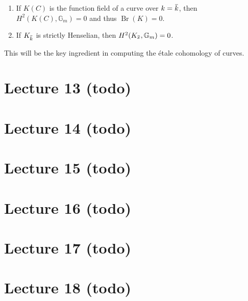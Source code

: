 \begin{theorem}[?]

\envlist

\begin{enumerate}
\def\labelenumi{\arabic{enumi}.}
\item
  If \(K(C)\) is the function field of a curve over
  \(k = \mkern 1.5mu\overline{\mkern-1.5muk\mkern-1.5mu}\mkern 1.5mu\),
  then \(H^2(K(C), {\mathbb{G}}_m) = 0\) and thus
  \(\operatorname{Br}(K) = 0\).
\item
  If
  \(K_{\mkern 1.5mu\overline{\mkern-1.5muk\mkern-1.5mu}\mkern 1.5mu}\)
  is strictly Henselian, then
  \(H^2(K_{\mkern 1.5mu\overline{\mkern-1.5mux\mkern-1.5mu}\mkern 1.5mu}, {\mathbb{G}}_m) = 0\).
\end{enumerate}

\end{theorem}

This will be the key ingredient in computing the étale cohomology of
curves.

\hypertarget{lecture-13-todo}{%
\section{Lecture 13 (todo)}\label{lecture-13-todo}}

\hypertarget{lecture-14-todo}{%
\section{Lecture 14 (todo)}\label{lecture-14-todo}}

\hypertarget{lecture-15-todo}{%
\section{Lecture 15 (todo)}\label{lecture-15-todo}}

\hypertarget{lecture-16-todo}{%
\section{Lecture 16 (todo)}\label{lecture-16-todo}}

\hypertarget{lecture-17-todo}{%
\section{Lecture 17 (todo)}\label{lecture-17-todo}}

\hypertarget{lecture-18-todo}{%
\section{Lecture 18 (todo)}\label{lecture-18-todo}}

